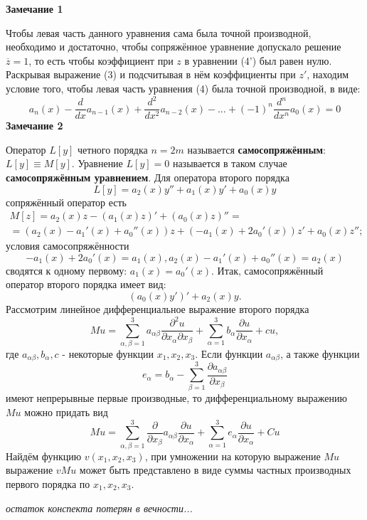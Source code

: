 \textbf{Замечание 1}

Чтобы левая часть данного уравнения сама была точной производной, необходимо и достаточно, чтобы сопряжённое уравнение допускало решение $\overline{z}=1$, то есть чтобы коэффициент при $z$ в уравнении (4') был равен нулю. Раскрывая выражение (3) и подсчитывая в нём коэффициенты при $z'$, находим условие того, чтобы левая часть уравнения (4) была точной производной, в виде:
\[
	a_n (x) - \frac{d}{dx} a_{n-1} (x) + \frac{d^2}{dx^2} a_{n-2} (x) - \dots + (-1)^n \frac{d^n}{dx^n} a_0(x) = 0
\]
\textbf{Замечание 2}

Оператор $L[y]$ четного порядка $n=2m$ называется \textbf{самосопряжённым}: $L[y] \equiv M[y]$. Уравнение $L[y]=0$ называется в таком случае \textbf{самосопряжённым уравнением}. Для оператора второго порядка
\[
	L[y] = a_2 (x) y'' + a_1 (x) y' + a_0 (x) y
\]
сопряжённый оператор есть
\[
	\begin{aligned}
	M[z] = a_2 (x)z - (a_1(x)z)' + (a_0(x)z)'' =  \\
	= (a_2 (x) - a_1'(x) + a_0''(x))z+ (-a_1(x)+2a_0'(x))z'+a_0(x)z'';
\end{aligned}
\]
условия самосопряжённости
\[
	-a_1(x)+2a_0'(x)=a_1(x), a_2(x)-a_1'(x)+a_0''(x)=a_2(x)
\]
сводятся к одному первому: $a_1(x) = a_0'(x)$. Итак, самосопряжённый оператор второго порядка имеет вид:
\[
	(a_0(x)y')'+a_2(x)y.
\]
Рассмотрим линейное дифференциальное выражение второго порядка
\[
	Mu = \sum_{\alpha,\beta=1}^3 a_{\alpha\beta} \frac{\partial^2 u}{\partial x_\alpha\partial x_\beta} + \sum_{\alpha=1}^3 b_\alpha \frac{\partial u}{\partial x_\alpha} + cu, \tag{6}
\]
где $a_{\alpha\beta}, b_\alpha, c$ - некоторые функции $x_1, x_2, x_3$. Если функции $a_{\alpha\beta}$, а также функции
\[
	e_\alpha = b_\alpha - \sum_{\beta = 1}^3 \frac{\partial a_{\alpha \beta}}{\partial x_\beta} \tag{7}
\]
имеют непрерывные первые производные, то дифференциальному выражению $Mu$ можно придать вид
\[
	Mu = \sum_{\alpha,\beta=1}^3\frac{\partial}{\partial x_\beta} a_{\alpha \beta} \frac{\partial u}{\partial x_\alpha} + \sum_{\alpha=1}^3 e_\alpha \frac{\partial u}{\partial x_\alpha} + Cu \tag{8}
\]
Найдём функцию $v(x_1,x_2,x_3)$, при умножении на которую выражение $Mu$ выражение $vMu$ может быть представлено в виде суммы частных производных первого порядка по $x_1, x_2, x_3$.

\textit{остаток конспекта потерян в вечности...}
